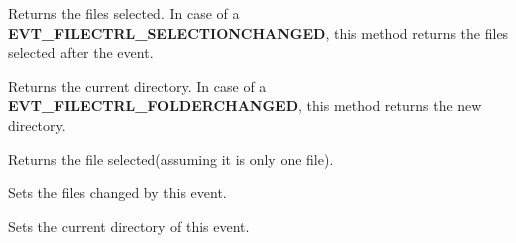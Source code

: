 Returns the files selected.
In case of a {\bf EVT\_FILECTRL\_SELECTIONCHANGED}, this method returns the
files selected after the event.

\label{wxfilectrleventgetdirectory}


Returns the current directory.
In case of a {\bf EVT\_FILECTRL\_FOLDERCHANGED}, this method returns the new directory.

\label{wxfilectrleventgetfile}


Returns the file selected(assuming it is only one file).

\label{wxfilectrleventsetfiles}


Sets the files changed by this event.

\label{wxfilectrleventsetdirectory}


Sets the current directory of this event.
